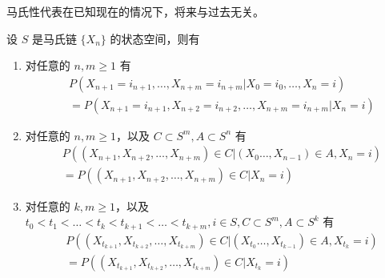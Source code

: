 \documentclass[lang=cn,10pt,thmcnt=section]{elegantbook}
\begin{document}
马氏性代表在已知现在的情况下，将来与过去无关。
\begin{theorem}
	设 $S$ 是马氏链 $\{X_n\}$ 的状态空间，则有
\begin{enumerate}
    \item 对任意的 $n, m \geq 1$ 有
    \[
    \begin{aligned}
    & P(X_{n+1} = i_{n+1}, \ldots, X_{n+m} = i_{n+m} | X_0 = i_0, \ldots, X_n = i) \\
    & = P(X_{n+1} = i_{n+1}, X_{n+2} = i_{n+2}, \ldots, X_{n+m} = i_{n+m} | X_n = i)
    \end{aligned}
    \]
    \item 对任意的 $n, m \geq 1$，以及 $C \subset S^m, A \subset S^n$ 有
    \[
    \begin{aligned}
    & P((X_{n+1}, X_{n+2}, \ldots, X_{n+m}) \in C | (X_0 \ldots, X_{n-1}) \in A, X_n = i) \\
    & = P((X_{n+1}, X_{n+2}, \ldots, X_{n+m}) \in C | X_n = i)
    \end{aligned}
    \]
    \item 对任意的 $k, m \geq 1$，以及 $t_0 < t_1 < \ldots < t_k < t_{k+1} < \ldots < t_{k+m}, i \in S, C \subset S^m, A \subset S^k$ 有
    \[
    \begin{aligned}
    & P((X_{t_{k+1}}, X_{t_{k+2}}, \ldots, X_{t_{k+m}}) \in C | (X_{t_0} \ldots, X_{t_{k-1}}) \in A, X_{t_k} = i) \\
    & = P((X_{t_{k+1}}, X_{t_{k+2}}, \ldots, X_{t_{k+m}}) \in C | X_{t_k} = i)
    \end{aligned}
    \]
\end{enumerate}
\end{theorem}
\end{document}
